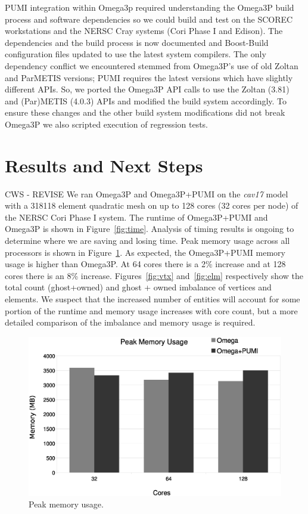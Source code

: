 \documentclass[a4paper]{article}
\begin{document}
PUMI integration within Omega3p required understanding the Omega3P build process
and software dependencies so we could build and test on the SCOREC workstations
and the NERSC Cray systems (Cori Phase I and Edison).
The dependencies and the build process is now documented and Boost-Build
configuration files updated to use the latest system compilers.
The only dependency conflict we encountered stemmed from Omega3P's use of old
Zoltan and ParMETIS versions; PUMI requires the latest versions which have
slightly different APIs.
So, we ported the Omega3P API calls to use the Zoltan (3.81) and
(Par)METIS (4.0.3) APIs and modified the build system accordingly.
To ensure these changes and the other build system modifications did not break
Omega3P we also scripted execution of regression tests.

\section{Results and Next Steps}\label{sec:results}

CWS - REVISE
We ran Omega3P and Omega3P+PUMI on the \textit{cav17} model with a 318118
element quadratic mesh on up to 128 cores (32 cores per node) of the NERSC Cori
Phase I system.
The runtime of Omega3P+PUMI and Omega3P is shown in Figure~\ref{fig:time}.
Analysis of timing results is ongoing to determine where we are saving and
losing time.
Peak memory usage across all processors is shown in
Figure~\ref{fig:memusage}.
As expected, the Omega3P+PUMI memory usage is higher than Omega3P.
At 64 cores there is a 2\% increase and at 128 cores there is an 8\% increase.
Figures~\ref{fig:vtx} and~\ref{fig:elm} respectively show the total count
(ghost+owned) and ghost + owned imbalance of vertices and
elements.
We suspect that the increased number of entities will account for some portion
of the runtime and memory usage increases with core count, but a more detailed
comparison of the imbalance and memory usage is required.

\begin{figure}[ht]
\centering
  \includegraphics[width=\textwidth]{peak-memory-usage.eps}
  \caption{\label{fig:memusage} Peak memory usage.}
\end{figure}
\end{document}
